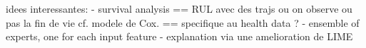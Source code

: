 idees interessantes:
- survival analysis == RUL avec des trajs ou on observe ou pas la fin de vie
  cf. modele de Cox. == specifique au health data ?
- ensemble of experts, one for each input feature
- explanation via une amelioration de LIME
